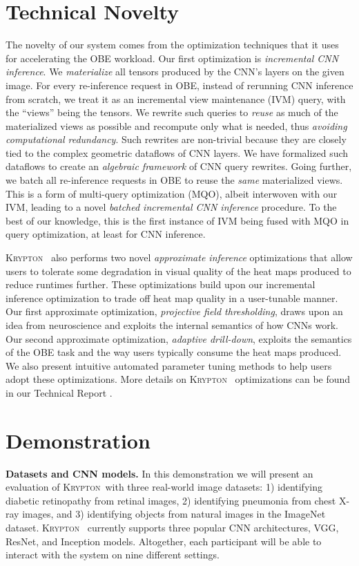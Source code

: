 \documentclass{vldb}
\newcommand{\system}{\textsc{Krypton}}
\begin{document}
\section{Technical Novelty}
The novelty of our system comes from the optimization techniques that it uses for accelerating the OBE workload.
Our first optimization is \textit{incremental CNN inference}. We \textit{materialize} all tensors produced by the CNN's layers on the given image. For every re-inference request in OBE, instead of rerunning CNN inference from scratch, we treat it as an incremental view maintenance (IVM) query, with the ``views'' being the tensors. We rewrite such queries to \textit{reuse} as much of the materialized views as possible and recompute only what is needed, thus \textit{avoiding computational redundancy}. Such rewrites are non-trivial because they are closely tied to the complex geometric dataflows of CNN layers. We have formalized such dataflows to create an \textit{algebraic framework} of CNN query rewrites. Going further, we batch all re-inference requests in OBE to reuse the \textit{same} materialized views. This is a form of multi-query optimization (MQO), albeit interwoven with our IVM, leading to a novel \textit{batched incremental CNN inference} procedure. To the best of our knowledge, this is the first instance of IVM being fused with MQO in query optimization, at least for CNN inference.

\system~ also performs two novel \textit{approximate inference} optimizations that allow users to tolerate some degradation in visual quality of the heat maps produced to reduce runtimes further. These optimizations build upon our incremental inference optimization to trade off heat map quality in a user-tunable manner. Our first approximate optimization, \textit{projective field thresholding}, draws upon an idea from neuroscience and exploits the internal semantics of how CNNs work. Our second approximate optimization, \textit{adaptive drill-down}, exploits the semantics of the OBE task and the way users typically consume the heat maps produced. We also present intuitive automated parameter tuning methods to help users adopt these optimizations.
More details on \system~ optimizations can be found in our Technical Report \cite{krypton}.


\section{Demonstration}\label{demonstration}
\textbf{Datasets and CNN models.} In this demonstration we will present an evaluation of \system ~with three real-world image datasets: 1) identifying diabetic retinopathy from retinal images, 2) identifying pneumonia from chest X-ray images, and 3) identifying objects from natural images in the ImageNet dataset. \system~ currently supports three popular CNN architectures, VGG, ResNet, and Inception models. Altogether, each participant will be able to interact with the system on nine different settings.
\end{document}
